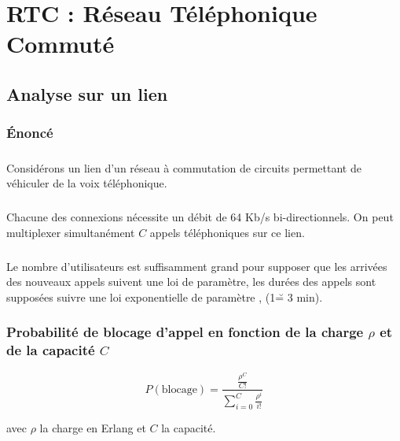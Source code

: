 %
\chapter{RTC : Réseau Téléphonique Commuté}
%
    \section{Analyse sur un lien}
        \label{seullien} %
%
        \subsection{Énoncé}
%
            \paragraph{}
Considérons un lien d'un réseau à commutation de circuits permettant de véhiculer de la voix téléphonique.
%
            \paragraph{}
Chacune des connexions nécessite un débit de 64 Kb/s bi-directionnels.
On peut multiplexer simultanément $C$ appels téléphoniques sur ce lien.
%
        \paragraph{}
Le nombre d'utilisateurs est suffisamment grand pour supposer que les arrivées des nouveaux appels suivent une loi de paramètre, les durées des appels sont supposées suivre une loi exponentielle de paramètre , (1\u = 3 min).
%
        \subsection{Probabilité de blocage d'appel en fonction de la charge $\rho$ et de la capacité $C$}
\[ P(\text{blocage}) = \frac{ \frac{ \rho^C }{ C! } }{ \sum\limits_{i=0}^C \frac{ \rho^i }{ i! } } \]
\begin{center}
    avec $\rho$ la charge en Erlang et $C$ la capacité.
\end{center}
%
